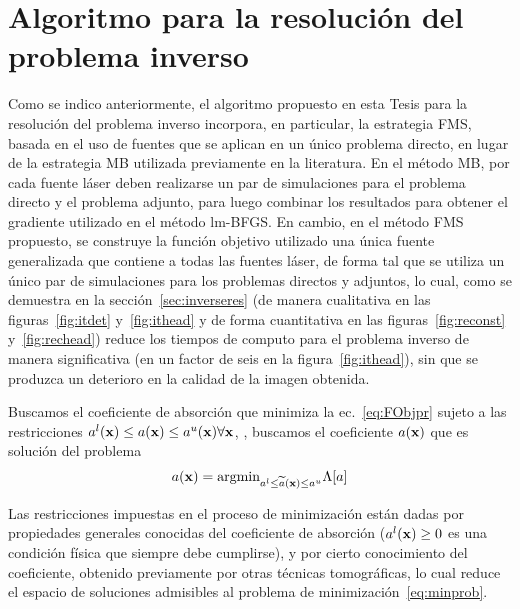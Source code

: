 \section{Algoritmo para la resolución del problema inverso}
\label{sec:inversesolv}

Como se indico anteriormente, el algoritmo propuesto en esta Tesis para la resolución del 
problema inverso incorpora, en particular, la estrategia FMS, basada 
en el uso de fuentes que se aplican en un único problema directo, 
en lugar de la estrategia MB utilizada previamente en la literatura. 
En el método MB, por cada fuente láser deben realizarse un par 
de simulaciones para el problema directo y el problema adjunto, 
para luego combinar los resultados para obtener el gradiente utilizado 
en el método lm-BFGS. En cambio, en el método FMS propuesto, 
se construye la función objetivo utilizado una única fuente 
generalizada que contiene a todas las fuentes láser, de forma tal 
que se utiliza un único par de simulaciones para los problemas directos 
y adjuntos, lo cual, como se demuestra en la sección~\ref{sec:inverseres} 
(de manera cualitativa en las figuras~\ref{fig:itdet} y~\ref{fig:ithead} 
y de forma cuantitativa en las figuras~\ref{fig:reconst} y~\ref{fig:rechead}) 
reduce los tiempos de computo para el problema inverso de manera significativa 
(\eg en un factor de seis en la figura~\ref{fig:ithead}), sin que se 
produzca un deterioro en la calidad de la imagen obtenida. 

Buscamos el coeficiente de absorción que minimiza la ec.~\eqref{eq:FObjpr}  
sujeto a las restricciones $a^l(\mathbf{x}) \leq a(\mathbf{x}) \leq a^u(\mathbf{x}) \forall \mathbf{x}$, \ie, buscamos 
el coeficiente $a(\mathbf{x})$ que es solución del problema 
\begin{equation}
\begin{split}
\begin{aligned}
a(\mathbf{x})=\text{argmin}_{a^l \leq \widetilde a(\mathbf{x}) \leq a^u} \Lambda[a]
\end{aligned}
\end{split}
\label{eq:minprob}
\end{equation}

Las restricciones impuestas en el proceso de minimización están dadas 
por propiedades generales conocidas del coeficiente de absorción ($a^l(\mathbf{x})\ge 0$ 
es una condición física que siempre debe cumplirse), y por cierto conocimiento 
del coeficiente, obtenido previamente por otras técnicas tomográficas, lo 
cual reduce el espacio de soluciones admisibles al problema de minimización~\eqref{eq:minprob}.

